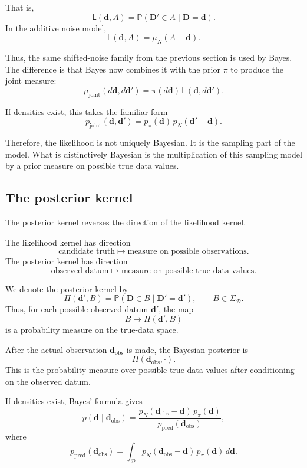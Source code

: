 \documentclass[11pt]{article}
\newcommand{\Dspace}{\mathcal D}
\newcommand{\SigmaD}{\Sigma_{\mathcal D}}
\newcommand{\muN}{\mu_N}
\newcommand{\prior}{\pi}
\newcommand{\Drand}{\mathbf D}
\newcommand{\Dobsrand}{\mathbf D'}
\newcommand{\dobs}{\mathbf d_{\mathrm{obs}}}
\newcommand{\Prob}{\mathbb P}
\begin{document}
That is,
\[
    \mathsf L(\mathbf d,A)
    =
    \Prob(\Dobsrand\in A\mid \Drand=\mathbf d).
\]
In the additive noise model,
\[
    \mathsf L(\mathbf d,A)
    =
    \muN(A-\mathbf d).
\]

Thus, the same shifted-noise family from the previous section is used by Bayes. The difference is that Bayes now combines it with the prior \(\prior\) to produce the joint measure:
\[
    \mu_{\mathrm{joint}}(d\mathbf d,d\mathbf d')
    =
    \prior(d\mathbf d)\,
    \mathsf L(\mathbf d,d\mathbf d').
\]

If densities exist, this takes the familiar form
\[
    p_{\mathrm{joint}}(\mathbf d,\mathbf d')
    =
    p_{\prior}(\mathbf d)\,
    p_N(\mathbf d'-\mathbf d).
\]

Therefore, the likelihood is not uniquely Bayesian. It is the sampling part of the model. What is distinctively Bayesian is the multiplication of this sampling model by a prior measure on possible true data values.

\subsection{The posterior kernel}

The posterior kernel reverses the direction of the likelihood kernel.

The likelihood kernel has direction
\[
    \text{candidate truth}
    \longmapsto
    \text{measure on possible observations}.
\]
The posterior kernel has direction
\[
    \text{observed datum}
    \longmapsto
    \text{measure on possible true data values}.
\]

We denote the posterior kernel by
\[
    \Pi(\mathbf d',B)
    =
    \Prob(\Drand\in B\mid \Dobsrand=\mathbf d'),
    \qquad
    B\in\SigmaD.
\]
Thus, for each possible observed datum \(\mathbf d'\), the map
\[
    B\longmapsto \Pi(\mathbf d',B)
\]
is a probability measure on the true-data space.

After the actual observation \(\dobs\) is made, the Bayesian posterior is
\[
    \Pi(\dobs,\cdot).
\]
This is the probability measure over possible true data values after conditioning on the observed datum.

If densities exist, Bayes' formula gives
\[
    p(\mathbf d\mid \dobs)
    =
    \frac{
        p_N(\dobs-\mathbf d)\,p_{\prior}(\mathbf d)
    }{
        p_{\mathrm{pred}}(\dobs)
    },
\]
where
\[
    p_{\mathrm{pred}}(\dobs)
    =
    \int_{\Dspace}
        p_N(\dobs-\mathbf d)\,
        p_{\prior}(\mathbf d)
    \,d\mathbf d.
\]
\end{document}
